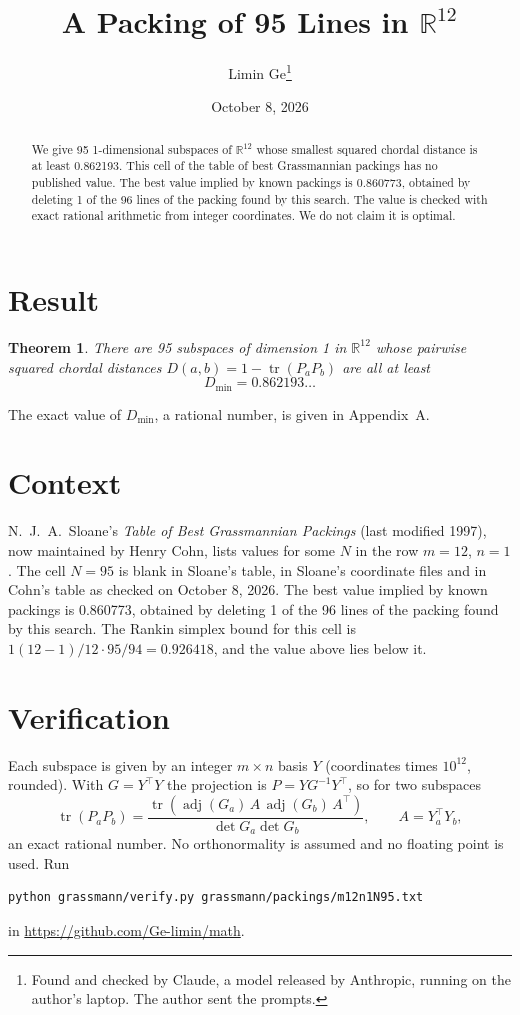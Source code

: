 \documentclass[11pt,a4paper]{article}
\title{A Packing of 95 Lines in $\mathbb{R}^{12}$}
\author{Limin Ge\thanks{Found and checked by Claude, a model released by Anthropic, running on the author's laptop. The author sent the prompts.}}
\date{October 8, 2026}
\newtheorem*{theorem}{Theorem}
\begin{document}
\maketitle
\begin{abstract}
We give 95 1-dimensional subspaces of $\mathbb{R}^{12}$ whose smallest squared chordal distance is at least 0.862193. This cell of the table of best Grassmannian packings has no published value. The best value implied by known packings is 0.860773, obtained by deleting 1 of the 96 lines of the packing found by this search. The value is checked with exact rational arithmetic from integer coordinates. We do not claim it is optimal.
\end{abstract}

\section{Result}
\begin{theorem}
There are 95 subspaces of dimension 1 in $\mathbb{R}^{12}$ whose pairwise squared chordal distances $D(a,b) = 1 - \operatorname{tr}(P_aP_b)$ are all at least
\[ D_{\min} = 0.862193\ldots \]
\end{theorem}
The exact value of $D_{\min}$, a rational number, is given in Appendix~A.


\section{Context}
N.~J.~A.~Sloane's \emph{Table of Best Grassmannian Packings} (last modified 1997), now maintained by Henry Cohn, lists values for some $N$ in the row $m=12$, $n=1$. The cell $N=95$ is blank in Sloane's table, in Sloane's coordinate files and in Cohn's table as checked on October 8, 2026. The best value implied by known packings is 0.860773, obtained by deleting 1 of the 96 lines of the packing found by this search. The Rankin simplex bound for this cell is $1(12-1)/12\cdot 95/94 = 0.926418$, and the value above lies below it.


\section{Verification}
Each subspace is given by an integer $m\times n$ basis $Y$ (coordinates times $10^{12}$, rounded). With $G=Y^\top Y$ the projection is $P=YG^{-1}Y^\top$, so for two subspaces
\[ \operatorname{tr}(P_aP_b)=\frac{\operatorname{tr}(\operatorname{adj}(G_a)\,A\,\operatorname{adj}(G_b)\,A^\top)}{\det G_a\det G_b},\qquad A=Y_a^\top Y_b, \]
an exact rational number. No orthonormality is assumed and no floating point is used. Run
\begin{verbatim}
python grassmann/verify.py grassmann/packings/m12n1N95.txt
\end{verbatim}
in \url{https://github.com/Ge-limin/math}.
\end{document}
